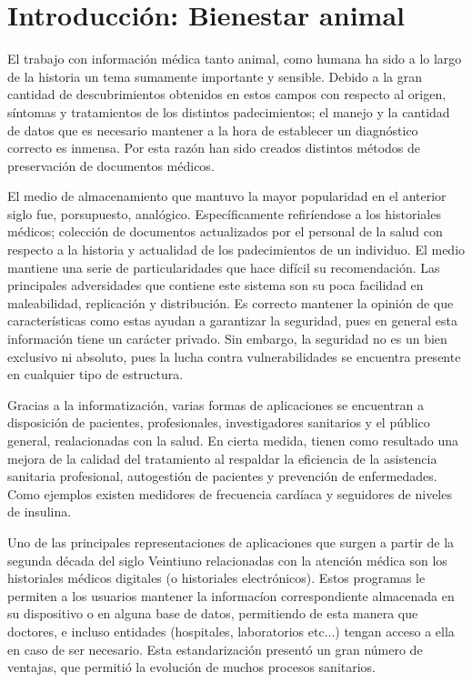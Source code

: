 
\chapter{Introducción: Bienestar animal}\label{chapter:introduction}

El trabajo con informaci\'on m\'edica tanto animal, como humana ha sido a lo largo de la historia un tema sumamente importante y sensible. Debido a la gran cantidad de descubrimientos obtenidos en estos campos con respecto al origen, s\'intomas y tratamientos de los distintos padecimientos; el manejo y la cantidad de datos que es necesario mantener a la hora de establecer un diagn\'ostico correcto es inmensa. Por esta raz\'on han sido creados distintos m\'etodos de preservaci\'on de documentos m\'edicos.

El medio de almacenamiento que mantuvo la mayor popularidad en el anterior siglo fue, porsupuesto, anal\'ogico. Espec\'ificamente refir\'iendose a los historiales m\'edicos; colecci\'on de documentos actualizados por el personal de la salud con respecto a la historia y actualidad de los padecimientos de un individuo. El medio mantiene una serie de particularidades que hace dif\'icil su recomendaci\'on. Las principales adversidades que contiene este sistema son su poca facilidad en maleabilidad, replicaci\'on y distribuci\'on. Es correcto mantener la opini\'on de que caracter\'isticas como estas ayudan a garantizar la seguridad, pues en general esta informaci\'on tiene un car\'acter privado. Sin embargo, la seguridad no es un bien exclusivo ni absoluto, pues la lucha contra vulnerabilidades se encuentra presente en cualquier tipo de estructura.

Gracias a la informatizaci\'on, varias formas de aplicaciones se encuentran a disposición de pacientes, profesionales, investigadores sanitarios y el p\'ublico general, realacionadas con la salud. En cierta medida, tienen como resultado una mejora de la calidad del tratamiento al respaldar la eficiencia de la asistencia sanitaria profesional, autogestión de pacientes y prevención de enfermedades. Como ejemplos existen medidores de frecuencia card\'iaca y seguidores de niveles de insulina.

Uno de las principales representaciones de aplicaciones que surgen a partir de la segunda d\'ecada del siglo Veintiuno relacionadas con la atenci\'on m\'edica son los historiales m\'edicos digitales (o historiales electr\'onicos). Estos programas le permiten a los usuarios mantener la informac\'ion correspondiente almacenada en su dispositivo o en alguna base de datos, permitiendo de esta manera que doctores, e incluso entidades (hospitales, laboratorios etc...) tengan acceso a ella en caso de ser necesario. Esta estandarizaci\'on present\'o un gran n\'umero de ventajas, que permiti\'o la evoluci\'on de muchos procesos sanitarios. 

